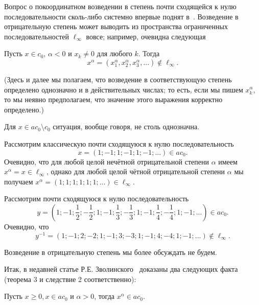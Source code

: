 Вопрос о покоординатном возведении в степень почти сходящейся к нулю последовательности сколь-либо системно впервые поднят в~\cite{zvol2022ac}.
Возведение в отрицательную степень может выводить из пространства ограниченных последовательностей $\ell_\infty$ вовсе;
например, очевидна следующая
\begin{lemma}
	Пусть $x\in c_0$, $\alpha< 0$ и $x_k\ne 0 $ для любого $k$.
	Тогда
	\begin{equation*}
		x^\alpha = (x_1^\alpha,x_2^\alpha,x_3^\alpha,...) \notin \ell_\infty
		.
	\end{equation*}
\end{lemma}
(Здесь и далее мы полагаем, что возведение в соответствующую степень определено однозначно и в действительных числах;
то есть, если мы пишем $x_k^\alpha$, то мы неявно предполагаем, что значение этого выражения корректно определено.)


Для $x\in ac_0\setminus c_0$ ситуация, вообще говоря, не столь однозначна.

\begin{example}
	\label{example:ac0_pow_signum_classic}
	Рассмотрим классическую почти сходящуюся к нулю последовательность
	\begin{equation}
		x = (1;-1;1;-1;1;-1;...) \in ac_0
		.
	\end{equation}
	Очевидно, что для любой целой нечётной отрицательной степени $\alpha$ имеем $x^\alpha = x \in \ell_\infty$,
	однако для любой целой чётной отрицательной степени $\alpha$ мы получаем $x^\alpha = (1;1;1;1;1;1;...) \in \ell_\infty$.
\end{example}

\begin{example}
	Рассмотрим почти сходящуюся к нулю последовательность
	\begin{equation}
		y = \left(1;-1;\frac12;-\frac12;1;-1;\frac13;-\frac13;1;-1;\frac14;-\frac14;1;-1;...\right) \in ac_0
		.
	\end{equation}
	Очевидно, что
	\begin{equation}
		y^{-1} = \left(1;-1;2;-2;1;-1;3;-3;1;-1;4;-4;1;-1;...\right)  \notin \ell_\infty
		.
	\end{equation}
\end{example}

Возведение в отрицательную степень мы более обсуждать не будем.

Итак, в недавней статье Р.Е. Зволинского~\cite{zvol2022ac} доказаны два следующих факта (теорема 3 и следствие 2 соответственно):
\begin{theorem}
	\label{thm:Zvol_pow_pos}
	Пусть $x \geqslant 0, x \in a c_0$ и $\alpha>0$, тогда $x^\alpha \in a c_0$.
\end{theorem}

